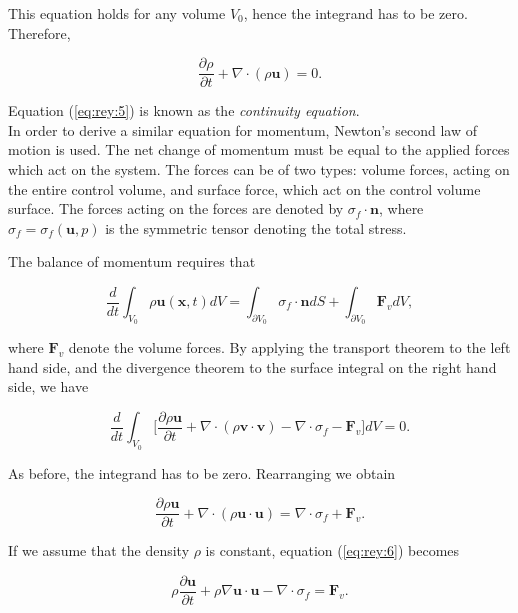 \documentclass[a4paper,11pt,openright,twoside]{book}
\begin{document}
This equation holds for any volume $V_0$, hence the integrand has to be zero. Therefore, 

\begin{equation}
\label{eq:rey:5}
\frac{\partial \rho}{\partial t	} + \nabla \cdot (\rho \mathbf{u}) = 0.
\end{equation}

Equation (\ref{eq:rey:5}) is known as the \emph{continuity equation}. \\

In order to derive a similar equation for momentum, Newton's second law of motion is used. The net change of momentum must be equal to the applied forces which act on the system. The forces can be of two types: volume forces, acting on the entire control volume, and surface force, which act on the control volume surface. The forces acting on the forces are denoted by $\sigma_f \cdot \mathbf{n}$, where $\sigma_f = \sigma_f (\mathbf{u}, p)$ is the symmetric tensor denoting the total stress.

The balance of momentum requires that

\begin{equation}
\frac{d}{dt} \int_{V_0} \rho \mathbf{u} (\mathbf{x}, t) dV =
\int_{\partial V_0} \sigma_f \cdot \mathbf{n} dS + \int_{\partial V_0} \mathbf{F}_v dV,
\end{equation}

where $\mathbf{F}_v$ denote the volume forces. By applying the transport theorem to the left hand side, and the divergence theorem to the surface integral on the right hand side, we have

\begin{equation}
\frac{d}{dt} \int_{V_0} \Big[ \frac{\partial \rho \mathbf{u}}{\partial t} + \nabla \cdot (\rho \mathbf{v \cdot v}) - \nabla \cdot \sigma_f - \mathbf{F}_v \Big] dV = 0.
\end{equation}

As before, the integrand has to be zero. Rearranging we obtain 

\begin{equation}
\label{eq:rey:6}
\frac{\partial \rho \mathbf{u}}{\partial t} + \nabla \cdot (\rho \mathbf{u} \cdot \mathbf{u}) = 
\nabla \cdot \sigma_f + \mathbf{F}_v.
\end{equation}

If we assume that the density $\rho$ is constant, equation (\ref{eq:rey:6}) becomes

\begin{equation}
\label{eq:rey:7}
\rho \frac{\partial \mathbf{u}}{\partial t} + \rho \nabla \mathbf{u} \cdot \mathbf{u} - \nabla \cdot \sigma_f = \mathbf{F}_v.
\end{equation}
\end{document}
